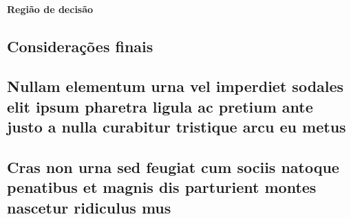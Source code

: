 \documentclass[
	article,			%
	11pt,				%
	oneside,			%
	a4paper,			%
	english,			%
	brazil,				%
	]{abntex2}
\begin{document}
\subsubsection{Região de decisão}



% 

\section*{Considerações finais}



\postextual



%
% 


\begin{apendicesenv}

\chapter{Nullam elementum urna vel imperdiet sodales elit ipsum pharetra ligula
ac pretium ante justo a nulla curabitur tristique arcu eu metus}
\lipsum[55-57]

\end{apendicesenv}

\begin{anexosenv}

\chapter{Cras non urna sed feugiat cum sociis natoque penatibus et magnis dis
parturient montes nascetur ridiculus mus}



\end{anexosenv}
\end{document}
